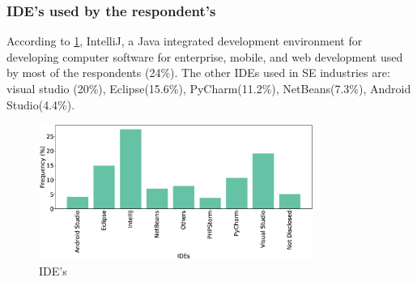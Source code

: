 \subsubsection{IDE's used by the respondent's}
According to \cref{fig:IDEs}, IntelliJ, a Java integrated development environment for developing computer software for enterprise, mobile, and web development used by most of the respondents (24\%). The other IDEs used in SE industries are: visual studio (20\%), Eclipse(15.6\%), PyCharm(11.2\%), NetBeans(7.3\%), Android Studio(4.4\%).
\begin{figure}[]
\centering
  \includegraphics[width=0.8\textwidth]{Figures/Respondents_IDEs}
  \caption{IDE's}
  \label{fig:IDEs}
\end{figure}
